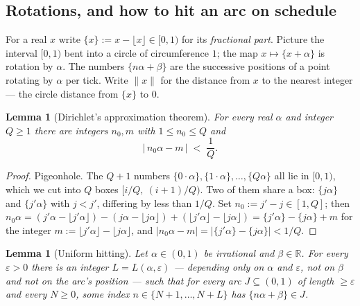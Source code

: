 \documentclass[11pt,reqno]{amsart}
\theoremstyle{plain}
\newtheorem{lemma}[theorem]{Lemma}
\theoremstyle{definition}
\theoremstyle{remark}
\newcommand{\RR}{\mathbb{R}}
\begin{document}
\subsection{Rotations, and how to hit an arc on schedule}

For a real $x$ write $\{x\} := x - \lfloor x \rfloor \in [0, 1)$ for its
\emph{fractional part}. Picture the interval $[0,1)$ bent into a circle of
circumference $1$; the map $x \mapsto \{x + \alpha\}$ is rotation by $\alpha$. The
numbers $\{n\alpha + \beta\}$ are the successive positions of a point rotating by
$\alpha$ per tick. Write $\|x\|$ for the distance from $x$ to the nearest integer
--- the circle distance from $\{x\}$ to $0$.

\begin{lemma}[Dirichlet's approximation theorem]\label{lem:dirichlet}
For every real $\alpha$ and integer $Q \ge 1$ there are integers $n_0, m$ with
$1 \le n_0 \le Q$ and
\[
  |\, n_0 \alpha - m \,| \;<\; \frac{1}{Q} .
\]
\end{lemma}

\begin{proof}
Pigeonhole. The $Q + 1$ numbers $\{0 \cdot \alpha\}, \{1 \cdot \alpha\}, \dots,
\{Q\alpha\}$ all lie in $[0,1)$, which we cut into $Q$ boxes $[i/Q,\ (i+1)/Q)$.
Two of them share a box: $\{j\alpha\}$ and $\{j'\alpha\}$ with $j < j'$, differing
by less than $1/Q$. Set $n_0 := j' - j \in [1, Q]$; then $n_0\alpha =
(j'\alpha - \lfloor j'\alpha \rfloor) - (j\alpha - \lfloor j\alpha \rfloor) +
(\lfloor j'\alpha \rfloor - \lfloor j\alpha \rfloor) = \{j'\alpha\} - \{j\alpha\} +
m$ for the integer $m := \lfloor j'\alpha \rfloor - \lfloor j\alpha \rfloor$, and
$|n_0\alpha - m| = |\{j'\alpha\} - \{j\alpha\}| < 1/Q$.
\end{proof}

\begin{lemma}[Uniform hitting]\label{lem:hitting-friendly}
Let $\alpha \in (0,1)$ be irrational and $\beta \in \RR$. For every $\varepsilon >
0$ there is an integer $L = L(\alpha, \varepsilon)$ --- depending only on $\alpha$
and $\varepsilon$, \emph{not} on $\beta$ and not on the arc's position --- such that
for every arc $J \subseteq (0,1)$ of length $\ge \varepsilon$ and every $N \ge 0$,
some index $n \in \{N+1, \dots, N+L\}$ has $\{n\alpha + \beta\} \in J$.
\end{lemma}
\end{document}
